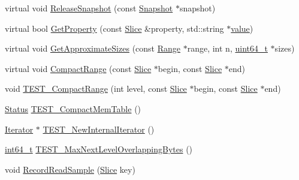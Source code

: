 \begin{DoxyCompactItemize}
\item 
virtual void \hyperlink{classleveldb_1_1_d_b_impl_a6c0b6abfc9a30cc8e5412d4fc3e8c886}{Release\-Snapshot} (const \hyperlink{classleveldb_1_1_snapshot}{Snapshot} $\ast$snapshot)
\item 
virtual bool \hyperlink{classleveldb_1_1_d_b_impl_ad1a2023ce171c8f8476664f5b1cbab4d}{Get\-Property} (const \hyperlink{classleveldb_1_1_slice}{Slice} \&property, std\-::string $\ast$\hyperlink{cache_8cc_a0f61d63b009d0880a89c843bd50d8d76}{value})
\item 
virtual void \hyperlink{classleveldb_1_1_d_b_impl_af08e218d92064699942c195ce0f06010}{Get\-Approximate\-Sizes} (const \hyperlink{structleveldb_1_1_range}{Range} $\ast$range, int n, \hyperlink{stdint_8h_aaa5d1cd013383c889537491c3cfd9aad}{uint64\-\_\-t} $\ast$sizes)
\item 
virtual void \hyperlink{classleveldb_1_1_d_b_impl_aa6df0739fc0b49380c284347e411b8ed}{Compact\-Range} (const \hyperlink{classleveldb_1_1_slice}{Slice} $\ast$begin, const \hyperlink{classleveldb_1_1_slice}{Slice} $\ast$end)
\item 
void \hyperlink{classleveldb_1_1_d_b_impl_a63fcb49466b689a534ba77d32cf84f99}{T\-E\-S\-T\-\_\-\-Compact\-Range} (int level, const \hyperlink{classleveldb_1_1_slice}{Slice} $\ast$begin, const \hyperlink{classleveldb_1_1_slice}{Slice} $\ast$end)
\item 
\hyperlink{classleveldb_1_1_status}{Status} \hyperlink{classleveldb_1_1_d_b_impl_a8642703fd1398cd8e3f5f24ee0b9da23}{T\-E\-S\-T\-\_\-\-Compact\-Mem\-Table} ()
\item 
\hyperlink{classleveldb_1_1_iterator}{Iterator} $\ast$ \hyperlink{classleveldb_1_1_d_b_impl_adba5bf4252bd94f7db50e62921b7ba53}{T\-E\-S\-T\-\_\-\-New\-Internal\-Iterator} ()
\item 
\hyperlink{stdint_8h_adec1df1b8b51cb32b77e5b86fff46471}{int64\-\_\-t} \hyperlink{classleveldb_1_1_d_b_impl_af621636048b8d3cfaa21238fe26ef0ca}{T\-E\-S\-T\-\_\-\-Max\-Next\-Level\-Overlapping\-Bytes} ()
\item 
void \hyperlink{classleveldb_1_1_d_b_impl_a254ae98e3425046c28ed0aa6d78b37d8}{Record\-Read\-Sample} (\hyperlink{classleveldb_1_1_slice}{Slice} key)
\end{DoxyCompactItemize}
